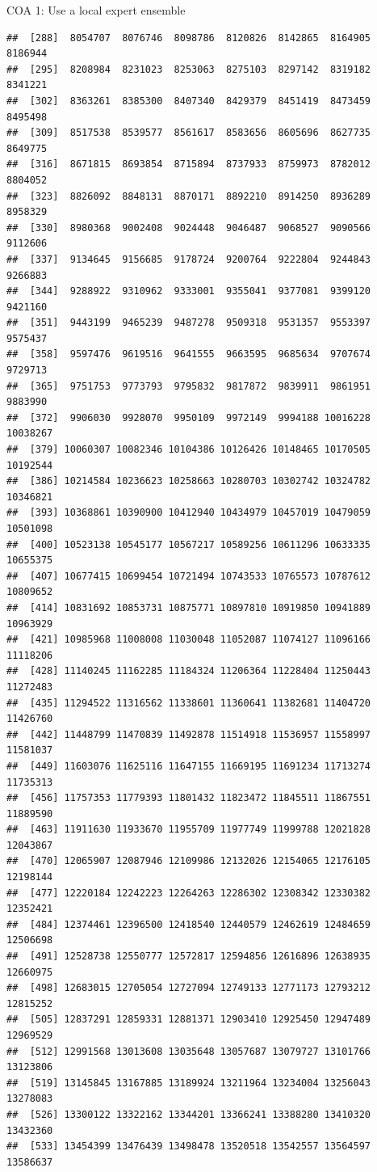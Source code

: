 \documentclass[ignorenonframetext,]{beamer}
\begin{document}
\begin{frame}[fragile]{COA 1: Use a local expert ensemble}
\begin{verbatim}
##  [288]  8054707  8076746  8098786  8120826  8142865  8164905  8186944
##  [295]  8208984  8231023  8253063  8275103  8297142  8319182  8341221
##  [302]  8363261  8385300  8407340  8429379  8451419  8473459  8495498
##  [309]  8517538  8539577  8561617  8583656  8605696  8627735  8649775
##  [316]  8671815  8693854  8715894  8737933  8759973  8782012  8804052
##  [323]  8826092  8848131  8870171  8892210  8914250  8936289  8958329
##  [330]  8980368  9002408  9024448  9046487  9068527  9090566  9112606
##  [337]  9134645  9156685  9178724  9200764  9222804  9244843  9266883
##  [344]  9288922  9310962  9333001  9355041  9377081  9399120  9421160
##  [351]  9443199  9465239  9487278  9509318  9531357  9553397  9575437
##  [358]  9597476  9619516  9641555  9663595  9685634  9707674  9729713
##  [365]  9751753  9773793  9795832  9817872  9839911  9861951  9883990
##  [372]  9906030  9928070  9950109  9972149  9994188 10016228 10038267
##  [379] 10060307 10082346 10104386 10126426 10148465 10170505 10192544
##  [386] 10214584 10236623 10258663 10280703 10302742 10324782 10346821
##  [393] 10368861 10390900 10412940 10434979 10457019 10479059 10501098
##  [400] 10523138 10545177 10567217 10589256 10611296 10633335 10655375
##  [407] 10677415 10699454 10721494 10743533 10765573 10787612 10809652
##  [414] 10831692 10853731 10875771 10897810 10919850 10941889 10963929
##  [421] 10985968 11008008 11030048 11052087 11074127 11096166 11118206
##  [428] 11140245 11162285 11184324 11206364 11228404 11250443 11272483
##  [435] 11294522 11316562 11338601 11360641 11382681 11404720 11426760
##  [442] 11448799 11470839 11492878 11514918 11536957 11558997 11581037
##  [449] 11603076 11625116 11647155 11669195 11691234 11713274 11735313
##  [456] 11757353 11779393 11801432 11823472 11845511 11867551 11889590
##  [463] 11911630 11933670 11955709 11977749 11999788 12021828 12043867
##  [470] 12065907 12087946 12109986 12132026 12154065 12176105 12198144
##  [477] 12220184 12242223 12264263 12286302 12308342 12330382 12352421
##  [484] 12374461 12396500 12418540 12440579 12462619 12484659 12506698
##  [491] 12528738 12550777 12572817 12594856 12616896 12638935 12660975
##  [498] 12683015 12705054 12727094 12749133 12771173 12793212 12815252
##  [505] 12837291 12859331 12881371 12903410 12925450 12947489 12969529
##  [512] 12991568 13013608 13035648 13057687 13079727 13101766 13123806
##  [519] 13145845 13167885 13189924 13211964 13234004 13256043 13278083
##  [526] 13300122 13322162 13344201 13366241 13388280 13410320 13432360
##  [533] 13454399 13476439 13498478 13520518 13542557 13564597 13586637

\end{verbatim}
\end{frame}
\end{document}
